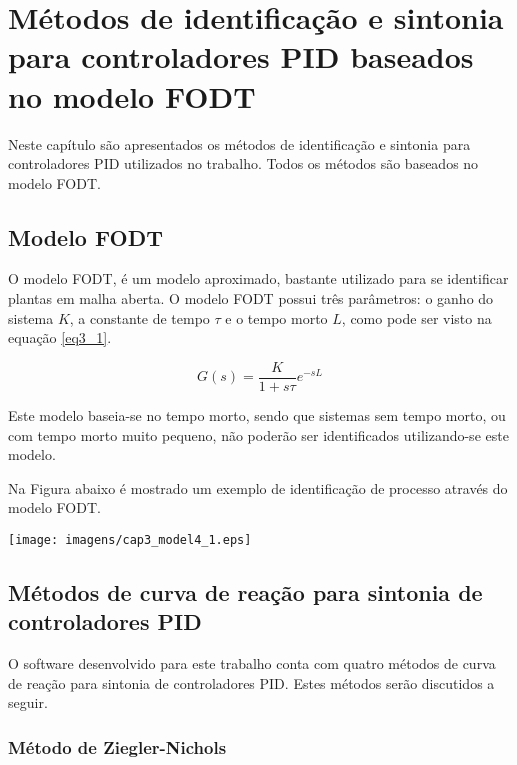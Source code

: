 \chapter{Métodos de identificação e sintonia para controladores PID
    baseados no modelo FODT \label{cap:metodos-de-identificacao-e-sintonia}}

Neste capítulo são apresentados os métodos de identificação e sintonia
para controladores PID utilizados no trabalho. Todos os métodos são
baseados no modelo FODT.

\section{Modelo FODT}

    O modelo \ac{FODT}, é um modelo aproximado, bastante utilizado para se
    identificar plantas em malha aberta. O modelo \acs{FODT}
    possui três parâmetros: o ganho do sistema $K$, a constante de tempo $\tau$
    e o tempo morto $L$, como pode ser visto na equação \ref{eq3_1}.

    \begin{equation}
        G(s) = \frac{K}{1 + s\tau} e^{-sL}
        \label{eq3_1}
    \end{equation}

    Este modelo baseia-se no tempo morto, sendo que sistemas sem tempo morto,
    ou com tempo morto muito pequeno, não poderão ser identificados utilizando-se
    este modelo.

    Na Figura abaixo é mostrado um exemplo de identificação de processo através
    do modelo \ac{FODT}.

    \begin{center}
        \texttt{[image: imagens/cap3\_model4\_1.eps]}
    \end{center}

\section{Métodos de curva de reação para sintonia de controladores PID}

    O software desenvolvido para este trabalho conta com quatro métodos de
    curva de reação para sintonia de controladores \acs{PID}. Estes métodos
    serão discutidos a seguir.
    
    \subsection{Método de Ziegler-Nichols}
        

